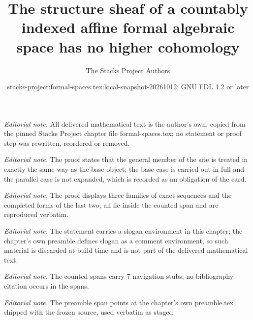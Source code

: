 \documentclass{stacks-project}
\title{The structure sheaf of a countably indexed affine formal algebraic space has no higher cohomology}
\author{The Stacks Project Authors}
\date{stacks-project:formal-spaces.tex:local-snapshot-20261012; GNU FDL 1.2 or later}
\theoremstyle{plain}
\theoremstyle{definition}
\theoremstyle{remark}
\numberwithin{equation}{subsection}
\begin{document}
\maketitle
\noindent\textit{Editorial note.} All delivered mathematical text is the author's own, copied from the pinned Stacks Project chapter file formal-spaces.tex; no statement or proof step was rewritten, reordered or removed.\par\medskip
\noindent\textit{Editorial note.} The proof states that the general member of the site is treated in exactly the same way as the base object; the base case is carried out in full and the parallel case is not expanded, which is recorded as an obligation of the card.\par\medskip
\noindent\textit{Editorial note.} The proof displays three families of exact sequences and the completed forms of the last two; all lie inside the counted span and are reproduced verbatim.\par\medskip
\noindent\textit{Editorial note.} The statement carries a slogan environment in this chapter; the chapter's own preamble defines slogan as a comment environment, so such material is discarded at build time and is not part of the delivered mathematical text.\par\medskip
\noindent\textit{Editorial note.} The counted spans carry 7 navigation stubs; no bibliography citation occurs in the spans.\par\medskip
\noindent\textit{Editorial note.} The preamble span points at the chapter's own preamble.tex shipped with the frozen source, used verbatim as staged.\par\medskip
\end{document}

